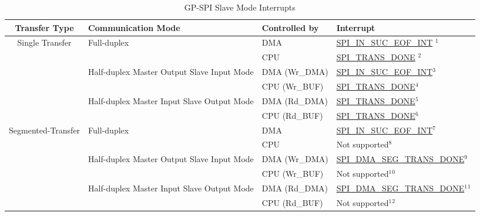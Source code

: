 \documentclass[main\_\_EN.tex]{subfiles}
\begin{document}
\begin{landscape}
\newpage
\begin{longtable}[c]{|c|l|l|l|}
\caption{GP-SPI Slave Mode Interrupts}
\label{Table:Slv_Int_Table}\\
\hline
\rowcolor{lightgray}
Transfer Type  & Communication Mode & Controlled by & Interrupt \\ \hline
\endhead
\multirow{6}{*}{Single Transfer} & \multirow{2}{*}{Full-duplex} & DMA & \hyperref[int:SPIINSUCEOFINT]{SPI\_IN\_SUC\_EOF\_INT} \hyperref[slave-note-1]{$^1$} \\ \cline{3-4}
&& CPU & \hyperref[fielddesc:SPITRANSDONE]{SPI\_TRANS\_DONE} \hyperref[slave-note-2]{$^2$}  \\ \cline{2-4}
& \multirow{2}{*}{Half-duplex Master Output Slave Input Mode} & DMA (Wr\_DMA) & \hyperref[int:SPIINSUCEOFINT]{SPI\_IN\_SUC\_EOF\_INT}\hyperref[slave-note-3]{$^3$}\\ \cline{3-4}
&& CPU (Wr\_BUF) & \hyperref[fielddesc:SPITRANSDONE]{SPI\_TRANS\_DONE}\hyperref[slave-note-4]{$^4$}  \\ \cline{2-4}
& \multirow{2}{*}{Half-duplex Master Input Slave Output Mode} & DMA (Rd\_DMA) & \hyperref[fielddesc:SPITRANSDONE]{SPI\_TRANS\_DONE}\hyperref[slave-note-5]{$^5$} \\ \cline{3-4}
&& CPU (Rd\_BUF) & \hyperref[fielddesc:SPITRANSDONE]{SPI\_TRANS\_DONE}\hyperref[slave-note-6]{$^6$} \\ \hline
\multirow{6}{*}{Segmented-Transfer} & \multirow{2}{*}{Full-duplex} & DMA & \hyperref[int:SPIINSUCEOFINT]{SPI\_IN\_SUC\_EOF\_INT}\hyperref[slave-note-7]{$^7$} \\ \cline{3-4}
&& CPU & Not supported\hyperref[slave-note-8]{$^8$} \\ \cline{2-4}
& \multirow{2}{*}{Half-duplex Master Output Slave Input Mode} & DMA (Wr\_DMA)  & \hyperref[fielddesc:SPIDMASEGTRANSDONE]{SPI\_DMA\_SEG\_TRANS\_DONE}\hyperref[slave-note-9]{$^9$} \\ \cline{3-4}
&& CPU (Wr\_BUF)           & Not supported\hyperref[slave-note-10]{$^1$$^0$}       \\ \cline{2-4}
& \multirow{2}{*}{Half-duplex Master Input Slave Output Mode} & DMA (Rd\_DMA) & \hyperref[fielddesc:SPIDMASEGTRANSDONE]{SPI\_DMA\_SEG\_TRANS\_DONE}\hyperref[slave-note-11]{$^1$$^1$} \\ \cline{3-4}
&& CPU (Rd\_BUF) & Not supported\hyperref[slave-note-12]{$^1$$^2$}       \\ \hline
\end{longtable}


\end{landscape}
\end{document}
